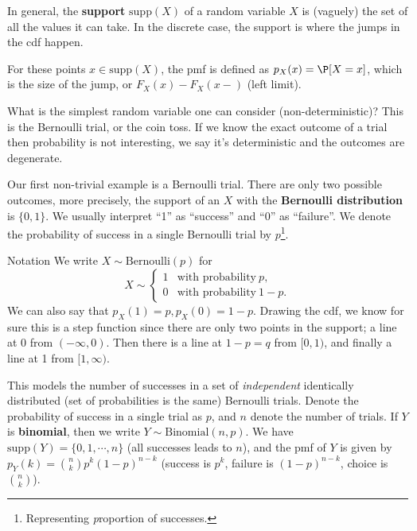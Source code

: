 In general, the \textbf{support} $\mathrm{supp}(X)$ of a random variable $X$ is (vaguely) the set of all the values it can take. In the discrete case, the support is where the jumps in the cdf happen. 
\begin{definition}
    For these points $x \in \mathrm{supp}(X)$, the pmf is defined as $p_X (x) = \P [X = x]$, which is the size of the jump, or $F_X(x) - F_X (x -)$ (left limit).
\end{definition}
What is the simplest random variable one can consider (non-deterministic)? This is the Bernoulli trial, or the coin toss. If we know the exact outcome of a trial then probability is not interesting, we say it's deterministic and the outcomes are degenerate. 
\begin{definition}
    Our first non-trivial example is a Bernoulli trial. There are only two possible outcomes, more precisely, the support of an $X$ with the \textbf{Bernoulli distribution} is $\{0,1\} $. We usually interpret ``1'' as ``success'' and ``0'' as ``failure''. We denote the probability of success in a single Bernoulli trial by $p$\footnote{Representing \emph{p}roportion of successes.}. 
\end{definition}
\begin{namedthing}{Notation} 
    We write $X\sim \mathrm{Bernoulli}(p)$ for \[
   X\sim 
   \begin{cases}
       1 & \text{with probability}  \ p,\\
       0 & \text{with probability} \ 1-p.
   \end{cases}
    \]We can also say that $p_X(1) = p, p_X(0)= 1-p$. Drawing the cdf, we know for sure this is a step function since there are only two points in the support; a line at 0 from $(-\infty,0)$. Then there is a line at $1-p =q$ from $[0,1)$, and finally a line at 1 from $[1,\infty)$.
\end{namedthing}
\begin{definition}
    This models the number of successes in a set of \emph{independent} identically distributed (set of probabilities is the same) Bernoulli trials. Denote the probability of success in a single trial as $p$, and $n$ denote the number of trials. If $Y$ is \textbf{binomial}, then we write $Y \sim \mathrm{Binomial}(n,p)$. We have $\mathrm{supp}(Y) = \{0,1, \cdots ,n\} $ (all successes leads to  $n$), and the pmf of $Y$ is given by $p_Y(k)= {n \choose k} p^k(1-p) ^{n-k}$ (success is $p^k$, failure is $(1-p)^{n-k}$, choice is ${n \choose k} $).
\end{definition}
